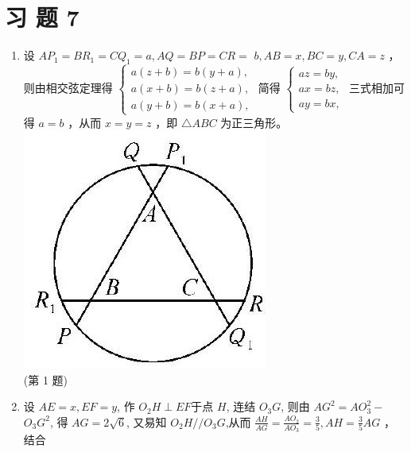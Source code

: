 \documentclass[10pt]{article}
\begin{document}
\section*{习 题 7}
\begin{enumerate}
  \item 设 $A P_{1}=B R_{1}=C Q_{1}=a, A Q=B P=C R=$ $b, A B=x, B C=y, C A=z$ ，则由相交弦定理得 $\left\{\begin{array}{l}a(z+b)=b(y+a), \\ a(x+b)=b(z+a), \\ a(y+b)=b(x+a),\end{array}\right.$ 简得 $\left\{\begin{array}{l}a z=b y, \\ a x=b z, \\ a y=b x,\end{array}\right.$ 三式相加可得 $a=b$ ，从而 $x=y=z$ ，即 $\triangle A B C$ 为正三角形。\\
\includegraphics[max width=\textwidth, center]{2024_10_30_66b8e5e701da2093c133g-098(3)}\\
(第 1 题)
  \item 设 $A E=x, E F=y$, 作 $O_{2} H \perp E F$于点 $H$, 连结 $O_{3} G$, 则由 $A G^{2}=A O_{3}^{2}-$ $O_{3} G^{2}$, 得 $A G=2 \sqrt{6}$, 又易知 $O_{2} H / / O_{3} G$,从而 $\frac{A H}{A G}=\frac{A O_{2}}{A O_{3}}=\frac{3}{5}, A H=\frac{3}{5} A G$ ，结合\\

\end{enumerate}
\end{document}
